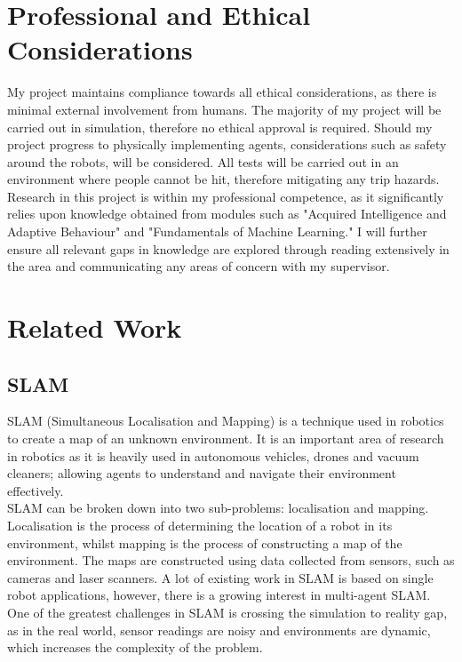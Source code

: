 \documentclass[12pt]{article}
\begin{document}
\section{Professional and Ethical Considerations}
My project maintains compliance towards all ethical considerations, as there is minimal external involvement from
humans. The majority of my project will be carried out in simulation, therefore no ethical approval is required. Should
my project progress to physically implementing agents, considerations such as safety around the robots, will be considered.
All tests will be carried out in an environment where people cannot be hit, therefore mitigating any trip hazards.\\
Research in this project is within my professional competence, as it significantly relies upon knowledge obtained from
modules such as "Acquired Intelligence and Adaptive Behaviour" and "Fundamentals of Machine Learning." I will further
ensure all relevant gaps in knowledge are explored through reading extensively in the area and communicating any areas
of concern with my supervisor.

\section{Related Work}
\subsection{SLAM}
SLAM (Simultaneous Localisation and Mapping) is a technique used in robotics to create a map of an unknown environment.
It is an important area of research in robotics as it is heavily used in autonomous vehicles, drones and vacuum cleaners;
allowing agents to understand and navigate their environment effectively.\\
SLAM can be broken down into two sub-problems: localisation and mapping. Localisation is the process of determining the
location of a robot in its environment, whilst mapping is the process of constructing a map of the environment. The maps
are constructed using data collected from sensors, such as cameras and laser scanners. A lot of existing work in SLAM is
based on single robot applications, however, there is a growing interest in multi-agent SLAM. One of the greatest
challenges in SLAM is crossing the simulation to reality gap, as in the real world, sensor readings are noisy and
environments are dynamic, which increases the complexity of the problem.
\end{document}
